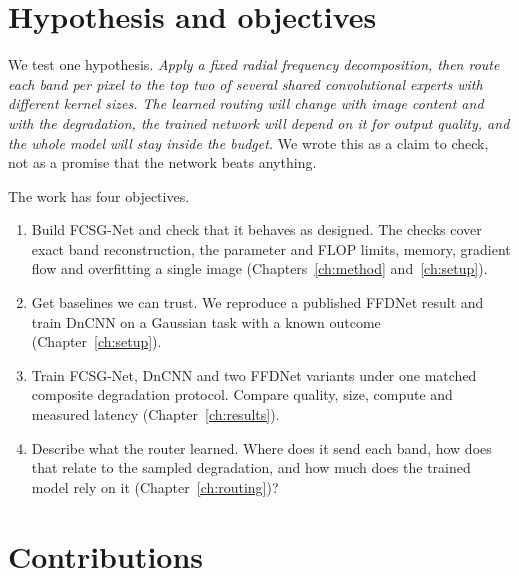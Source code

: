 \documentclass[12pt,a4paper,oneside]{NITR}
\newcommand{\fcsg}{FCSG-Net}
\begin{document}
\section{Hypothesis and objectives}\label{sec:objectives}

We test one hypothesis. \emph{Apply a fixed radial frequency decomposition,
then route each band per pixel to the top two of several shared
convolutional experts with different kernel sizes. The learned routing will
change with image content and with the degradation, the trained network will
depend on it for output quality, and the whole model will stay inside the
budget.} We wrote this as a claim to check, not as a promise that the network
beats anything.

The work has four objectives.
\begin{enumerate}
	\item[\textbf{O1}] Build \fcsg{} and check that it behaves as designed.
	The checks cover exact band reconstruction, the parameter and FLOP
	limits, memory, gradient flow and overfitting a single image
	(Chapters~\ref{ch:method} and~\ref{ch:setup}).
	\item[\textbf{O2}] Get baselines we can trust. We reproduce a published
	FFDNet result and train DnCNN on a Gaussian task with a known outcome
	(Chapter~\ref{ch:setup}).
	\item[\textbf{O3}] Train \fcsg{}, DnCNN and two FFDNet variants under one
	matched composite degradation protocol. Compare quality, size, compute and
	measured latency (Chapter~\ref{ch:results}).
	\item[\textbf{O4}] Describe what the router learned. Where does it send
	each band, how does that relate to the sampled degradation, and how much
	does the trained model rely on it (Chapter~\ref{ch:routing})?
\end{enumerate}

\section{Contributions}\label{sec:contributions}
\end{document}
